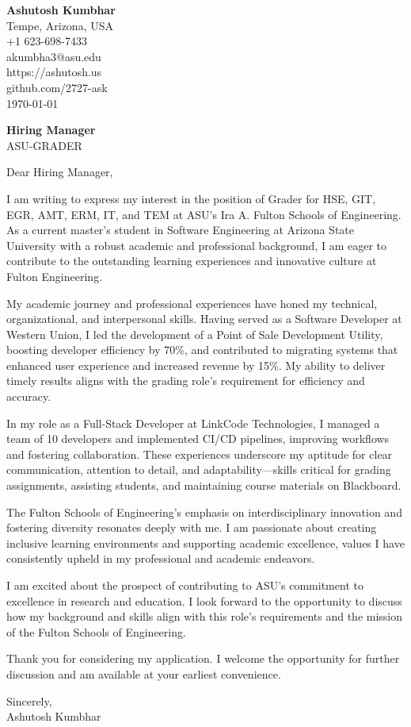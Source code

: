 \documentclass[11pt]{article}
\begin{document}
\begin{flushleft}
\textbf{Ashutosh Kumbhar} \\
Tempe, Arizona, USA \\
+1 623-698-7433 \\
akumbha3@asu.edu \\
https://ashutosh.us \\
github.com/2727-ask \\
\today
\end{flushleft}

\vspace{0.5em}

\textbf{Hiring Manager} \\
ASU-GRADER \\

\vspace{1em}

Dear Hiring Manager,

I am writing to express my interest in the position of Grader for HSE, GIT, EGR, AMT, ERM, IT, and TEM at ASU's Ira A. Fulton Schools of Engineering. As a current master’s student in Software Engineering at Arizona State University with a robust academic and professional background, I am eager to contribute to the outstanding learning experiences and innovative culture at Fulton Engineering.

My academic journey and professional experiences have honed my technical, organizational, and interpersonal skills. Having served as a Software Developer at Western Union, I led the development of a Point of Sale Development Utility, boosting developer efficiency by 70\%, and contributed to migrating systems that enhanced user experience and increased revenue by 15\%. My ability to deliver timely results aligns with the grading role's requirement for efficiency and accuracy.

In my role as a Full-Stack Developer at LinkCode Technologies, I managed a team of 10 developers and implemented CI/CD pipelines, improving workflows and fostering collaboration. These experiences underscore my aptitude for clear communication, attention to detail, and adaptability—skills critical for grading assignments, assisting students, and maintaining course materials on Blackboard.

The Fulton Schools of Engineering's emphasis on interdisciplinary innovation and fostering diversity resonates deeply with me. I am passionate about creating inclusive learning environments and supporting academic excellence, values I have consistently upheld in my professional and academic endeavors.

I am excited about the prospect of contributing to ASU’s commitment to excellence in research and education. I look forward to the opportunity to discuss how my background and skills align with this role's requirements and the mission of the Fulton Schools of Engineering.

Thank you for considering my application. I welcome the opportunity for further discussion and am available at your earliest convenience.

Sincerely, \\
Ashutosh Kumbhar
\end{document}
